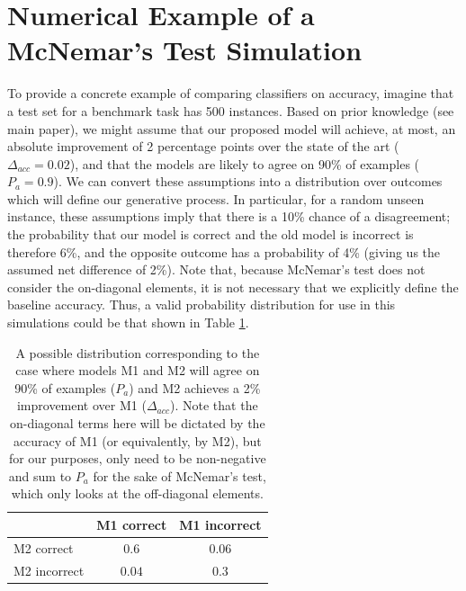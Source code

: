 \documentclass[11pt,a4paper]{article}
\begin{document}
\section{Numerical Example of a McNemar's Test Simulation}
\label{app:mcnemar_example}
To provide a concrete example of comparing classifiers on accuracy, imagine that a test set for a benchmark task has 500 instances. Based on prior knowledge (see main paper), we might assume that our proposed model will achieve, at most, an absolute improvement of 2 percentage points over the state of the art ($\Delta_{acc}=0.02$), and that the models are likely to agree on 90\% of examples ($P_a=0.9$). We can convert these assumptions into a distribution over outcomes which will define our generative process. In particular, for a random unseen instance, these assumptions imply that there is a 10\% chance of a disagreement; the probability that our model is correct and the old model is incorrect is therefore 6\%, and the opposite outcome has a probability of 4\% (giving us the assumed net difference of 2\%). Note that, because McNemar's test does not consider the on-diagonal elements, it is not necessary that we explicitly define the baseline accuracy. Thus, a valid probability distribution for use in this simulations could be that shown in Table \ref{tab:contingency_example}.

\begin{table}[]
\begin{center}
\begin{tabular}{l|cc}
        & M1 correct & M1 incorrect\\\hline
M2 correct & $0.6$ & $0.06$\\ 
M2 incorrect & $0.04$ & $0.3$\\ 
\end{tabular}
\end{center}
    \caption{A possible distribution corresponding to the case where models M1 and M2 will agree on 90\% of examples ($P_a$) and M2 achieves a 2\% improvement over M1 ($\Delta_{acc}$). Note that the on-diagonal terms here will be dictated by the accuracy of M1 (or equivalently, by M2), but for our purposes, only need to be non-negative and sum to $P_a$ for the sake of McNemar's test, which only looks at the off-diagonal elements.}
    \label{tab:contingency_example}
\end{table}
\end{document}
